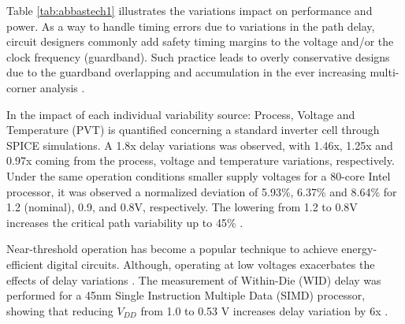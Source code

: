\documentclass[pgmicro,mestrado,english]{iiufrgs}
\begin{document}
\begin{table}[H]
\centering
\caption{Impact of variability on performance and power.}
\label{tab:abbastech1}
\end{table}

Table \ref{tab:abbastech1} illustrates the variations impact on performance and power. As a way to handle timing errors due to variations in the path delay, circuit designers commonly add safety timing margins to the voltage and/or the clock frequency (guardband). Such practice leads to overly conservative designs due to the guardband overlapping and accumulation in the ever increasing multi-corner analysis \cite{austin2005opportunities}.


In \cite{jeong2009impact} the impact of each individual variability source: Process, Voltage and Temperature (PVT) is quantified concerning a standard inverter cell through SPICE simulations. A 1.8x delay variations was observed, with 1.46x, 1.25x and 0.97x coming from the process, voltage and temperature variations, respectively. Under the same operation conditions smaller supply voltages for a 80-core Intel processor, it was observed a normalized deviation of 5.93\%, 6.37\% and 8.64\% for 1.2 (nominal), 0.9, and 0.8V, respectively. The lowering from 1.2 to 0.8V increases the critical path variability up to 45\% \cite{dighe2011within}.

Near-threshold operation has become a popular technique to achieve energy-efficient digital circuits. Although, operating at low voltages exacerbates the effects of delay variations \cite{jeon2012design, dreslinski2010near, rithe2011effect, kakoee2012variation, pawlowski2012530mv}.
The measurement of Within-Die (WID) delay was performed for a 45nm Single Instruction Multiple Data (SIMD) processor, showing that reducing $V_{DD}$ from 1.0 to 0.53 V increases delay variation by 6x \cite{pawlowski2012530mv}.
\end{document}
